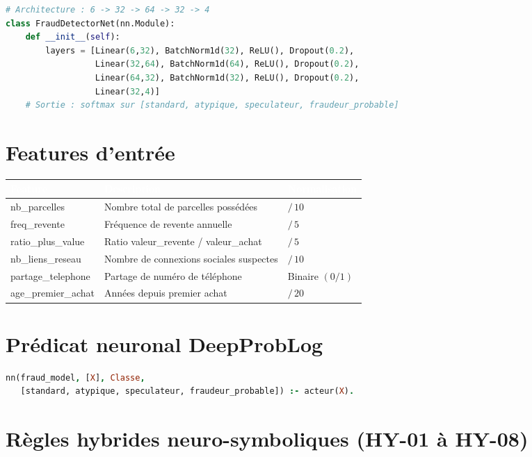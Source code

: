 \documentclass[11pt,a4paper]{report}
\begin{document}
\begin{lstlisting}[language=Python]
# Architecture : 6 -> 32 -> 64 -> 32 -> 4
class FraudDetectorNet(nn.Module):
    def __init__(self):
        layers = [Linear(6,32), BatchNorm1d(32), ReLU(), Dropout(0.2),
                  Linear(32,64), BatchNorm1d(64), ReLU(), Dropout(0.2),
                  Linear(64,32), BatchNorm1d(32), ReLU(), Dropout(0.2),
                  Linear(32,4)]
    # Sortie : softmax sur [standard, atypique, speculateur, fraudeur_probable]
\end{lstlisting}

\section{Features d'entrée}

\begin{center}
\begin{tabular}{>{\ttfamily}p{4.5cm} p{6cm} p{3cm}}
\toprule
\rowcolor{tablehead}\textcolor{white}{Feature} & \textcolor{white}{Description} & \textcolor{white}{Normalisation} \\
\midrule
nb\_parcelles      & Nombre total de parcelles possédées & $/\,10$ \\
freq\_revente      & Fréquence de revente annuelle & $/\,5$ \\
ratio\_plus\_value & Ratio valeur\_revente / valeur\_achat & $/\,5$ \\
nb\_liens\_reseau  & Nombre de connexions sociales suspectes & $/\,10$ \\
partage\_telephone & Partage de numéro de téléphone & Binaire $(0/1)$ \\
age\_premier\_achat& Années depuis premier achat & $/\,20$ \\
\bottomrule
\end{tabular}
\end{center}

\section{Prédicat neuronal DeepProbLog}

\begin{lstlisting}[language=Prolog]
% Predicat neuronal -- pont PyTorch <-> Prolog
nn(fraud_model, [X], Classe,
   [standard, atypique, speculateur, fraudeur_probable]) :- acteur(X).
\end{lstlisting}

\section{Règles hybrides neuro-symboliques (HY-01 à HY-08)}
\end{document}
